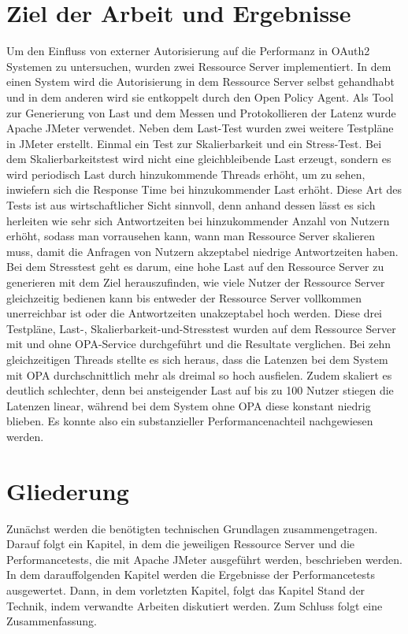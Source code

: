 \section{Ziel der Arbeit und Ergebnisse}
\label{sec:intro:goal}
Um den Einfluss von externer Autorisierung auf die Performanz in OAuth2 Systemen zu untersuchen, wurden zwei Ressource Server implementiert. In dem einen System wird die Autorisierung in dem Ressource Server selbst gehandhabt und in dem anderen wird sie entkoppelt durch den Open Policy Agent. 
Als Tool zur Generierung von Last und dem Messen und Protokollieren der Latenz wurde Apache JMeter verwendet. Neben dem Last-Test wurden zwei weitere Testpläne in JMeter erstellt. Einmal ein Test zur Skalierbarkeit und ein Stress-Test. Bei dem Skalierbarkeitstest wird nicht eine gleichbleibende Last erzeugt, sondern es wird periodisch Last durch hinzukommende Threads erhöht, um zu sehen, inwiefern sich die Response Time bei hinzukommender Last erhöht. Diese Art des Tests ist aus wirtschaftlicher Sicht sinnvoll, denn anhand dessen lässt es sich herleiten wie sehr sich Antwortzeiten bei hinzukommender Anzahl von Nutzern erhöht, sodass man vorrausehen kann, wann man Ressource Server skalieren muss, damit die Anfragen von Nutzern akzeptabel niedrige Antwortzeiten haben. Bei dem Stresstest geht es darum, eine hohe Last auf den Ressource Server zu generieren mit dem Ziel herauszufinden, wie viele Nutzer der Ressource Server gleichzeitig bedienen kann bis entweder der Ressource Server vollkommen unerreichbar ist oder die Antwortzeiten unakzeptabel hoch werden. Diese drei Testpläne, Last-, Skalierbarkeit-und-Stresstest wurden auf dem Ressource Server mit und ohne OPA-Service durchgeführt und die Resultate verglichen. 
Bei zehn gleichzeitigen Threads stellte es sich heraus, dass die Latenzen bei dem System mit OPA durchschnittlich mehr als dreimal so hoch ausfielen. Zudem skaliert es deutlich schlechter, denn bei ansteigender Last auf bis zu 100 Nutzer stiegen die Latenzen linear, während bei dem System ohne OPA diese konstant niedrig blieben. Es konnte also ein substanzieller Performancenachteil nachgewiesen werden. 

%
%
\section{Gliederung}
\label{sec:intro:structure}
Zunächst werden die benötigten technischen Grundlagen zusammengetragen. Darauf folgt ein Kapitel, in dem die jeweiligen Ressource Server und die Performancetests, die mit Apache JMeter ausgeführt werden, beschrieben werden. In dem darauffolgenden Kapitel werden die Ergebnisse der Performancetests ausgewertet. Dann, in dem vorletzten Kapitel, folgt das Kapitel Stand der Technik, indem verwandte Arbeiten diskutiert werden. Zum Schluss folgt eine Zusammenfassung. 
